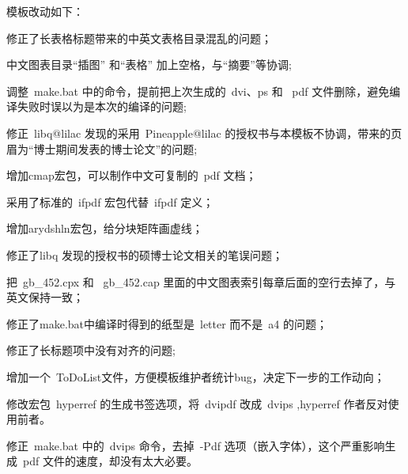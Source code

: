 模板改动如下：
\begin{hitlist}
 \item 修正了长表格标题带来的中英文表格目录混乱的问题；
 \item 中文图表目录``插图'' 和``表格'' 加上空格，与``摘要''等协调;
 \item 调整~make.bat 中的命令，提前把上次生成的~dvi、ps 和~ pdf 文件删除，避免编译失败时误以为是本次的编译的问题;
 \item 修正~libq@lilac 发现的采用~Pineapple@lilac 的授权书与本模板不协调，带来的页眉为“博士期间发表的博士论文”的问题;
 \item 增加cmap宏包，可以制作中文可复制的~pdf 文档；
 \item 采用了标准的~ifpdf 宏包代替~ifpdf 定义；
 \item 增加arydshln宏包，给分块矩阵画虚线；
 \item 修正了libq 发现的授权书的硕博士论文相关的笔误问题；
 \item 把~gb\_452.cpx 和 ~gb\_452.cap 里面的中文图表索引每章后面的空行去掉了，与英文保持一致；
 \item 修正了make.bat中编译时得到的纸型是~letter 而不是~a4 的问题；
 \item 修正了长标题项中没有对齐的问题;
 \item 增加一个~ToDoList文件，方便模板维护者统计bug，决定下一步的工作动向；
 \item 修改宏包~hyperref 的生成书签选项，将~dvipdf 改成~dvips ,hyperref 作者反对使用前者。
 \item 修正~make.bat 中的~dvips 命令，去掉~-Pdf 选项（嵌入字体），这个严重影响生成~pdf 文件的速度，却没有太大必要。
\end{hitlist}

